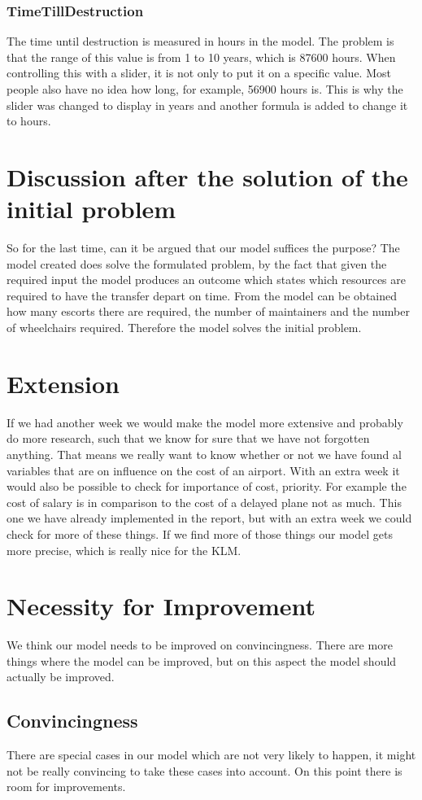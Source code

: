 \documentclass[a4paper, 11pt, notitlepage]{report}
\begin{document}
		\subsection{TimeTillDestruction}
		The time until destruction is measured in hours in the model. The problem is that the range of this value is from 1 to 10 years, which is 87600 hours. When controlling this with a slider, it is not only to put it on a specific value. Most people also have no idea how long, for example, 56900 hours is. This is why the slider was changed to display in years and another formula is added to change it to hours.
		
\chapter{Discussion after the solution of the initial problem}
So for the last time, can it be argued that our model suffices the purpose? The model created does solve the formulated problem, by the fact that given the required input the model produces an outcome which states which resources are required to have the transfer depart on time. From the model can be obtained how many escorts there are required, the number of maintainers and the number of wheelchairs required. Therefore the model solves the initial problem.
\chapter{Extension}
If we had another week we would make the model more extensive and probably do more research, such that we know for sure that we have not forgotten anything. That means we really want to know whether or not we have found al variables that are on influence on the cost of an airport. With an extra week it would also be possible to check for importance of cost, priority. For example the cost of  salary is in comparison to the cost of a delayed plane not as much. This one we have already implemented in the report, but with an extra week we could check for more of these things. If we find more of those things our model gets more precise, which is really nice for the KLM.

\chapter{Necessity for Improvement}
We think our model needs to be improved on convincingness. There are more things where the model can be improved, but on this aspect the model should actually be improved.
\section{Convincingness}
There are special cases in our model which are not very likely to happen, it might not be really convincing to take these cases into account. On this point there is room for improvements.
\end{document}
